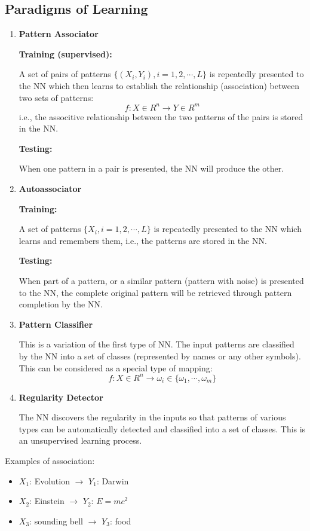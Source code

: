 \subsection*{Paradigms of Learning}

\begin{enumerate}
\item {\bf Pattern Associator}
	
	{\bf Training (supervised):}
	
	A set of pairs of patterns $\{(X_i, Y_i), i=1,2, \cdots, L\}$
	is repeatedly presented to the NN which then learns to establish
	the relationship (association) between two sets of patterns:
	\[	f: X \in R^n \rightarrow Y \in R^m	\]
	i.e., the associtive relationship between the two patterns of 
	the pairs is stored in the NN.

	{\bf Testing:}

	When one pattern in a pair is presented, the NN will produce the 
	other.

\item {\bf Autoassociator}

	{\bf Training:}

	A set of patterns $\{X_i, i=1,2, \cdots, L\}$ is repeatedly presented
	to the NN which learns and remembers them, i.e., the patterns are 
	stored in the NN.

	{\bf Testing:}

	When part of a pattern, or a similar pattern (pattern with noise)
	is presented to the NN, the complete original pattern will be
	retrieved through pattern completion by the NN.

\item {\bf Pattern Classifier}

	This is a variation of the first type of NN. The input patterns
	are classified by the NN into a set of classes (represented by
	names or any other symbols). This can be considered as a special
	type of mapping:
\[	f: X \in R^n \rightarrow \omega_i \in \{\omega_1, \cdots, \omega_m\} \]

\item {\bf Regularity Detector}	

	The NN discovers the regularity in the inputs so that patterns of
	various types can be automatically detected and classified into a 
	set of classes.	This is an unsupervised learning process.

\end{enumerate}

Examples of association:
\begin{itemize}
	\item $X_1$: Evolution $\rightarrow$ $Y_1$: Darwin
	\item $X_2$: Einstein $\rightarrow$ $Y_2$: $E=mc^2$
	\item $X_3$: sounding bell $\rightarrow$ $Y_3$: food
\end{itemize}

